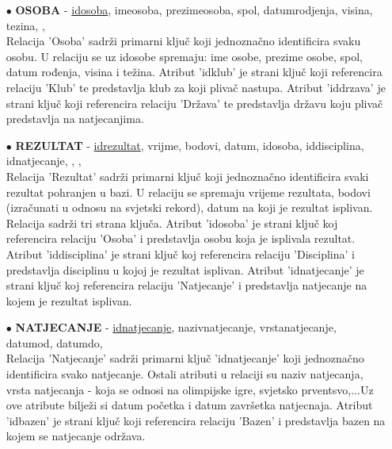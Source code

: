 \documentclass[times, utf8, zavrsni]{fer}
\begin{document}
\begin{itemize}
    \item[$\bullet$] \textbf{OSOBA} - \underline{idosoba}, imeosoba, prezimeosoba, spol, datumrodjenja, visina, tezina, 
    ,  \\
    Relacija 'Osoba' sadrži primarni ključ koji jednoznačno identificira svaku osobu. U relaciju se uz idosobe spremaju: ime osobe, prezime osobe,
    spol, datum rođenja, visina i težina. Atribut 'idklub' je strani ključ koji referencira relaciju 'Klub' te predstavlja klub za koji plivač nastupa.
    Atribut 'iddrzava' je strani ključ koji referencira relaciju 'Država' te predstavlja državu koju plivač predstavlja na natjecanjima.
    
\vspace{\baselineskip}

    \item[$\bullet$] \textbf{REZULTAT} - \underline{idrezultat}, vrijme, bodovi, datum, idosoba, iddisciplina, idnatjecanje,
    , ,  \\
    Relacija 'Rezultat' sadrži primarni ključ koji jednoznačno identificira svaki rezultat pohranjen u bazi. U relaciju se spremaju vrijeme rezultata, 
    bodovi (izračunati u odnosu na svjetski rekord), datum na koji je rezultat isplivan. Relacija sadrži tri strana ključa. Atribut 'idosoba' je strani ključ
    koj referencira relaciju 'Osoba' i predstavlja osobu koja je isplivala rezultat. Atribut 'iddisciplina' je strani ključ
    koj referencira relaciju 'Disciplina' i predstavlja disciplinu u kojoj je rezultat isplivan. Atribut 'idnatjecanje' je strani ključ
    koj referencira relaciju 'Natjecanje' i predstavlja natjecanje na kojem je rezultat isplivan.

\vspace{\baselineskip}

    \item[$\bullet$] \textbf{NATJECANJE} - \underline{idnatjecanje}, nazivnatjecanje, vrstanatjecanje, datumod, datumdo,  \\
    Relacija 'Natjecanje' sadrži primarni ključ 'idnatjecanje' koji jednoznačno identificira svako natjecanje. Ostali atributi u relaciji su naziv natjecanja, 
    vrsta natjecanja - koja se odnosi na olimpijske igre, svjetsko prventsvo,...Uz ove atribute bilježi si datum početka i datum završetka natjecnaja.
    Atribut 'idbazen' je strani ključ koji referencira relaciju 'Bazen' i predstavlja bazen na kojem se natjecanje održava.


\end{itemize}
\end{document}

